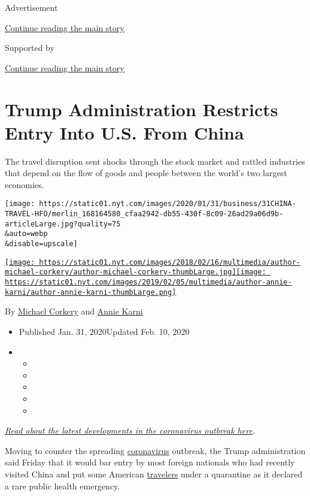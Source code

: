 Advertisement

\protect\hyperlink{after-top}{Continue reading the main story}

Supported by

\protect\hyperlink{after-sponsor}{Continue reading the main story}

\hypertarget{trump-administration-restricts-entry-into-us-from-china}{%
\section{Trump Administration Restricts Entry Into U.S. From
China}\label{trump-administration-restricts-entry-into-us-from-china}}

The travel disruption sent shocks through the stock market and rattled
industries that depend on the flow of goods and people between the
world's two largest economies.

\texttt{[image: https://static01.nyt.com/images/2020/01/31/business/31CHINA-TRAVEL-HFO/merlin\_168164580\_cfaa2942-db55-430f-8c09-26ad29a06d9b-articleLarge.jpg?quality=75\\\&auto=webp\\\&disable=upscale]}

\href{https://www.nytimes.com/by/michael-corkery}{\texttt{[image: https://static01.nyt.com/images/2018/02/16/multimedia/author-michael-corkery/author-michael-corkery-thumbLarge.jpg]}}\href{https://www.nytimes.com/by/annie-karni}{\texttt{[image: https://static01.nyt.com/images/2019/02/05/multimedia/author-annie-karni/author-annie-karni-thumbLarge.png]}}

By \href{https://www.nytimes.com/by/michael-corkery}{Michael Corkery}
and \href{https://www.nytimes.com/by/annie-karni}{Annie Karni}

\begin{itemize}
\item
  Published Jan. 31, 2020Updated Feb. 10, 2020
\item
  \begin{itemize}
  \item
  \item
  \item
  \item
  \item
  \end{itemize}
\end{itemize}

\href{https://www.nytimes.com/2020/02/02/world/asia/china-coronavirus.html}{\emph{Read
about the latest developments in the coronavirus outbreak here}}\emph{.}

Moving to counter the spreading
\href{https://www.nytimes.com/2020/02/10/business/china-coronavirus-philippines-travel.html}{coronavirus}
outbreak, the Trump administration said Friday that it would bar entry
by most foreign nationals who had recently visited China and put some
American
\href{https://www.nytimes.com/2020/02/10/business/china-coronavirus-philippines-travel.html}{travelers}
under a quarantine as it declared a rare public health emergency.


